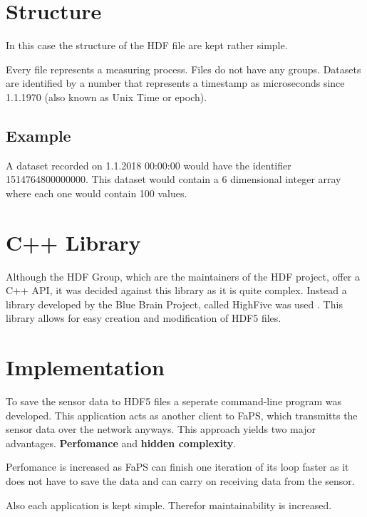 
\section{Structure}

In this case the structure of the HDF file are kept rather simple.

Every file represents a measuring process. Files do not have any groups. Datasets are identified by a number that represents a timestamp as microseconds since 1.1.1970 (also known as Unix Time or epoch).

\subsection{Example}

A dataset recorded on 1.1.2018 00:00:00 would have the identifier 1514764800000000. This dataset would contain a 6 dimensional integer array where each one would contain 100 values.

\section {C++ Library}

Although the HDF Group, which are the maintainers of the HDF project, offer a C++ API, it was decided against this library as it is quite complex. Instead a library developed by the Blue Brain Project, called HighFive was
used \cite{HighFive}. This library allows for easy creation and modification of HDF5 files.

\section{Implementation}

To save the sensor data to HDF5 files a seperate command-line program was developed. This application acts as another client to FaPS, which transmitts the sensor data over the network anyways. This approach yields two
major advantages. \textbf{Perfomance} and \textbf{hidden complexity}.

Perfomance is increased as FaPS can finish one iteration of its loop faster as it does not have to save the data and can carry on receiving data from the sensor.

Also each application is kept simple. Therefor maintainability is increased.
